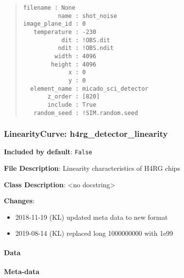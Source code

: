 \begin{quote}
\begin{alltt}
\begin{lstlisting}[frame=single]
      filename : None
          name : shot_noise
image_plane_id : 0
   temperature : -230
           dit : !OBS.dit
          ndit : !OBS.ndit
         width : 4096
        height : 4096
             x : 0
             y : 0
  element_name : micado_sci_detector
       z_order : [820]
       include : True
   random_seed : !SIM.random.seed
\end{lstlisting}
\end{alltt}
\end{quote}


\subsubsection{LinearityCurve: \textquotedbl{}h4rg\_detector\_linearity\textquotedbl{}%
  \label{linearitycurve-h4rg-detector-linearity}%
}

\textbf{Included by default}: \texttt{False}

\textbf{File Description}: Linearity characteristics of H4RG chips

\textbf{Class Description}: <no docstring>

\textbf{Changes}:

\begin{itemize}
\item 2018-11-19 (KL) updated meta data to new format

\item 2019-08-14 (KL) replaced long 1000000000 with 1e99
\end{itemize}


\paragraph{Data%
  \label{id9}%
}

\begin{figure}[H]
\noindent{}\label{fig-h4rg-detector-linearity}
\end{figure}


\paragraph{Meta-data%
  \label{id10}%
}

